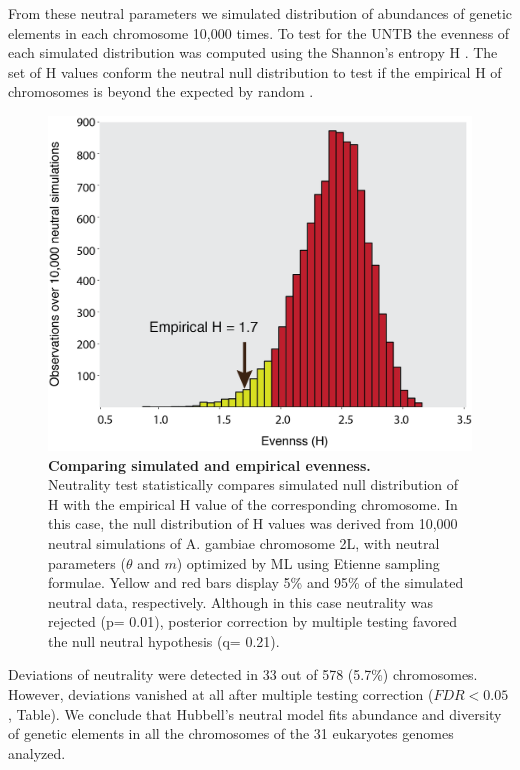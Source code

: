 From these neutral parameters we simulated distribution of abundances of genetic elements in each chromosome 10,000 times. To test for the UNTB the evenness of each simulated distribution was computed using the Shannon's entropy H \cite{Jabot2011}. The set of H values conform the neutral null distribution to test if the empirical H of chromosomes is beyond the expected by random .

\begin{figure}[htpb] 
\centering 
\includegraphics[width=\textwidth]{tex_source/figures/untb_genomes/shannon_distrib.png}
\caption[Comparing simulated and empirical evenness.]{{\bf Comparing simulated and empirical evenness. }\\Neutrality test statistically compares simulated null distribution of H with the empirical H value of the corresponding chromosome. In this case, the null distribution of H values was derived from 10,000 neutral simulations of A. gambiae chromosome 2L, with neutral parameters ($\theta$ and $m$) optimized by ML using Etienne sampling formulae. Yellow and red bars display 5\% and 95\% of the simulated neutral data, respectively. Although in this case neutrality was rejected (p= 0.01), posterior correction by multiple testing favored the null neutral hypothesis (q= 0.21).}
\label{fig:shannon_distrib}
\end{figure}

Deviations of neutrality were detected in 33 out of 578 (5.7\%) chromosomes. However, deviations vanished at all after multiple testing correction ($FDR< 0.05$, Table). We conclude that Hubbell's neutral model fits abundance and diversity of genetic elements in all the chromosomes of the 31 eukaryotes genomes analyzed. 


